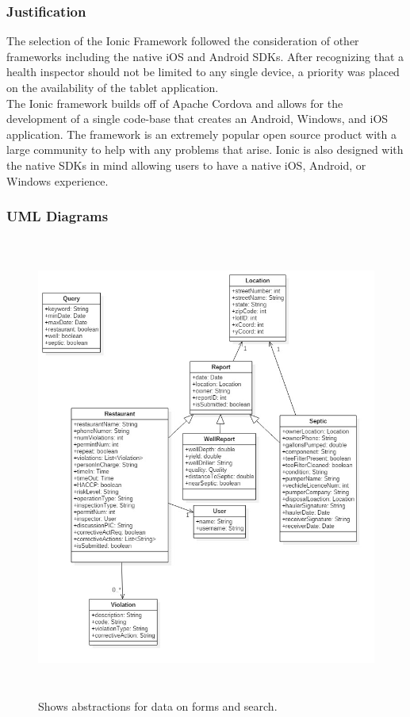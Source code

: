 \documentclass[twoside,letterpaper]{article}
\begin{document}
\subsubsection{Justification}
The selection of the Ionic Framework followed the consideration of other frameworks including the native iOS and Android SDKs. After recognizing that a health inspector should not be limited to any single device, a priority was placed on the availability of the tablet application. 
\\
The Ionic framework builds off of Apache Cordova and allows for the development of a single code-base that creates an Android, Windows, and iOS application. The framework is an extremely popular open source product with a large community to help with any problems that arise. Ionic is also designed with the native SDKs in mind allowing users to have a native iOS, Android, or Windows experience.

\subsubsection{UML Diagrams}

\begin{figure}[H]
\centering
\includegraphics[width=6in,height=6in]{uml.jpg}
\caption{Shows abstractions for data on forms and search.}
\end{figure}
\end{document}
